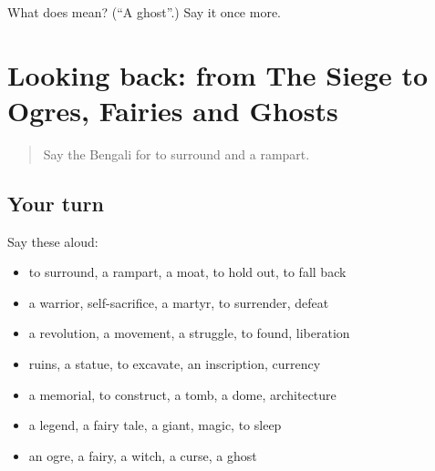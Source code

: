 \begin{tcolorbox}[breakable,colback=teal!4,colframe=teal!35!black,title={Before you move on}]
What does  mean? (\textquotedblleft{}A ghost\textquotedblright{}.) Say it once more.
\end{tcolorbox}
\section[(dialogue)]{Looking back: from The Siege to Ogres, Fairies and Ghosts}

\label{lesson:BN-R322-review-316-322}



\begin{quote}
Say the Bengali for to surround and a rampart.
\end{quote}

\subsection*{Your turn}
Say these aloud:

\begin{itemize}
\raggedright
  \item to surround, a rampart, a moat, to hold out, to fall back
  \item a warrior, self-sacrifice, a martyr, to surrender, defeat
  \item a revolution, a movement, a struggle, to found, liberation
  \item ruins, a statue, to excavate, an inscription, currency
  \item a memorial, to construct, a tomb, a dome, architecture
  \item a legend, a fairy tale, a giant, magic, to sleep
  \item an ogre, a fairy, a witch, a curse, a ghost
\end{itemize}

